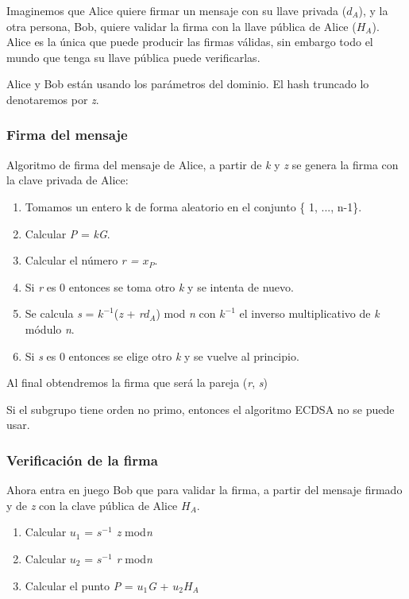 \documentclass[11pt]{article}
\begin{document}
Imaginemos que Alice quiere firmar un mensaje con su llave privada ($d_{A}$), y la otra persona, Bob, quiere validar la firma con la llave pública de Alice ($H_{A}$). Alice es la única que puede producir las firmas válidas, sin embargo todo el mundo que tenga su llave pública puede verificarlas.

Alice y Bob están usando los parámetros del dominio. El hash truncado lo denotaremos por \textit{z}.

\subsubsection*{Firma del mensaje}
Algoritmo de firma del mensaje de Alice, a partir de \textit{k} y \textit{z} se genera la firma con la clave privada de Alice:


\begin{enumerate}
	\item Tomamos un entero k de forma aleatorio en el conjunto \{ 1, ..., n-1\}.
	\item Calcular \textit{P} = \textit{kG}.
	\item Calcular el número \textit{r = $x_{P}$}.
	\item Si \textit{r} es 0 entonces se toma otro \textit{k} y se intenta de nuevo.
	\item Se calcula \textit{s} = \textit{$k^{-1}$}(\textit{z} + \textit{r$d_{A}$}) mod \textit{n}  con \textit{$k^{-1}$} el inverso multiplicativo de \textit{k} módulo \textit{n}.
	\item Si \textit{s} es 0 entonces se elige otro \textit{k} y se vuelve al principio.
\end{enumerate} 

Al final obtendremos la firma que será la pareja (\textit{r}, \textit{s}) 


Si el subgrupo tiene orden no primo, entonces el algoritmo ECDSA no se puede usar.

\subsubsection*{Verificación de la firma}
Ahora entra en juego Bob que para validar la firma, a partir del mensaje firmado y de \textit{z} con la clave pública de Alice \textit{$H_A$}.

\begin{enumerate}
	\item Calcular \textit{$u_1$} = \textit{$s^{-1}$ z} mod\textit{n}
	\item Calcular \textit{$u_2$} = \textit{$s^{-1}$ r} mod\textit{n}
	\item Calcular el punto \textit{P} = \textit{$u_1$G} + \textit{$u_2$$H_A$}	
\end{enumerate}
\end{document}
